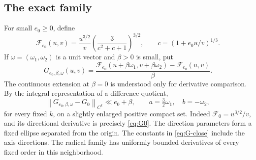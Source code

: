 \documentclass[11pt,a4paper]{article}
\numberwithin{equation}{section}
\theoremstyle{remark}
\newcommand{\norm}[1]{\left\lVert #1\right\rVert}
\begin{document}
\subsection{The exact family}
For small $e_0\ge0$, define
\begin{equation}\label{eq:Fe}
 \mathcal F_{e_0}(u,v)=\frac{u^{3/2}}v
       \left(\frac3{c^2+c+1}\right)^{3/2},
 \qquad c=(1+e_0u/v)^{1/3}.
\end{equation}
If $\omega=(\omega_1,\omega_2)$ is a unit vector and $\beta>0$ is small, put
\begin{equation}\label{eq:Gexact}
 G_{e_0,\beta,\omega}(u,v)
 =\frac{\mathcal F_{e_0}(u+\beta\omega_1,v+\beta\omega_2)
              -\mathcal F_{e_0}(u,v)}{\beta}.
\end{equation}
The continuous extension at $\beta=0$ is understood only for derivative
comparison. By the integral representation of a difference quotient,
\begin{equation}\label{eq:G-close}
 \norm{G_{e_0,\beta,\omega}-G_0}_{C^k}\ll e_0+\beta,
 \qquad a=\tfrac32\omega_1,\quad b=-\omega_2,
\end{equation}
for every fixed $k$, on a slightly enlarged positive compact set. Indeed
$\mathcal F_0=u^{3/2}/v$, and its directional derivative is precisely
\eqref{eq:G0}. The direction parameters form a fixed ellipse separated
from the origin. The constants in \eqref{eq:G-close} include the axis
directions. The radical family has uniformly bounded derivatives of every
fixed order in this neighborhood.
\end{document}
